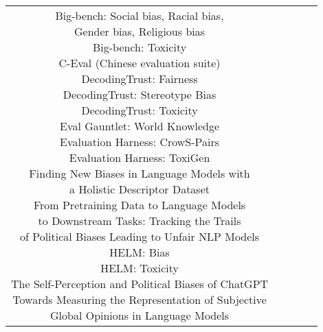 \documentclass[fleqn]{article}
\begin{document}
\begin{landscape}
\begin{table}[H]
\begin{tabular}{|c|c|c|c|c|}
{			\textbullet\hspace{3pt} Big-bench: Social bias, Racial bias,\\\hspace{10pt}Gender bias, Religious bias\\ 	
			\textbullet\hspace{3pt} Big-bench: Toxicity\\ 	
			\textbullet\hspace{3pt} C-Eval (Chinese evaluation suite)\\ 	
			\textbullet\hspace{3pt} DecodingTrust: Fairness\\ 	
			\textbullet\hspace{3pt} DecodingTrust: Stereotype Bias\\ 	
			\textbullet\hspace{3pt} DecodingTrust: Toxicity\\ 	
			\textbullet\hspace{3pt} Eval Gauntlet: World Knowledge\\ 	
			\textbullet\hspace{3pt} Evaluation Harness: CrowS-Pairs\\ 	
			\textbullet\hspace{3pt} Evaluation Harness: ToxiGen\\ 	
			\textbullet\hspace{3pt} Finding New Biases in Language Models with\\\hspace{10pt}a Holistic Descriptor Dataset\\ 	
			\textbullet\hspace{3pt} From Pretraining Data to Language Models\\\hspace{10pt}to Downstream Tasks: 
			Tracking the Trails\\\hspace{10pt}of Political Biases Leading to Unfair NLP Models\\ 	
			\textbullet\hspace{3pt} HELM: Bias\\ 	
			\textbullet\hspace{3pt} HELM: Toxicity\\ 	
			\textbullet\hspace{3pt} The Self-Perception and Political Biases of ChatGPT\\ 	
			\textbullet\hspace{3pt} Towards Measuring the Representation of Subjective\\\hspace{10pt}Global Opinions in Language Models \\ 	
}
\end{tabular}
\end{table}
\end{landscape}
\end{document}
